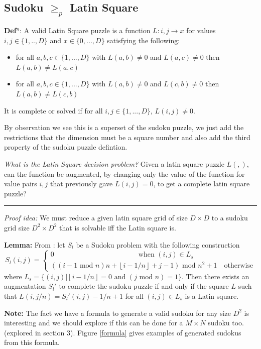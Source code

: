 \documentclass[a4paper,11pt]{report}
\newcounter{row}
\begin{document}
\subsection{Sudoku $\geq_p$ Latin Square}

\textbf{Def$^n$}: A valid Latin Square puzzle is a function $L:i,j \rightarrow x$ for values $i,j \in \{1,..,D\} $ and $x \in
\{0,...,D\}$ satisfying the following:
\begin{itemize}
\item{for all $a,b,c \in \{1,...,D\}$ with $L(a,b) \neq 0 $ and $L(a,c) \neq 0$ then $L(a,b) \neq L(a,c)$}
\item{for all $a,b,c \in \{1,...,D\}$ with $L(a,b) \neq 0 $ and $L(c,b) \neq 0$ then $L(a,b) \neq L(c,b)$}
\end{itemize}
It is complete or solved if for all $i,j \in \{1,...,D\}$, $L(i,j) \neq 0$.

By observation we see this is a superset of the sudoku puzzle, we just add the restrictions that the dimension must be a square number and also add the third property of the sudoku puzzle defintion.

\textit{What is the Latin Square decision problem?} Given a latin square puzzle $L(,)$, can the function be augmented, by changing only the value of the function for value pairs $i,j$ that previously gave $L(i,j) =0$, to get a complete latin square puzzle?

\noindent\rule{4cm}{0.4pt}

\textit{Proof idea:} We must reduce a given latin square grid of size $D \times D$ to a sudoku grid size $D^2 \times D^2$ that is solvable iff the Latin square is.

\textbf{Lemma:} From \cite{sls}: let $S_l$ be a Sudoku problem with the following construction 
\begin{equation}
	S_l(i,j) =\begin{cases}
0 \qquad\qquad\qquad\qquad\qquad\qquad\text{when } (i,j) \in L_s \\ 
((i-1 \text{ mod } n)n + \left\lfloor{i-1/n}\right\rfloor+j-1)\text{ mod } n^2 +1 \quad\text{otherwise}
\end{cases}
\end{equation}
where $L_s=\{(i,j)| \left\lfloor{i-1/n}\right\rfloor=0 \text{ and }(j \text{ mod }n)=1\}$. Then there exists an augmentation $S_l'$ to complete the sudoku puzzle if and only if the square $L$ such that $L(i,j/n)=S_l'(i,j)-1/n+1$ for all $(i,j) \in L_s$ is a Latin square.

\textbf{Note:} The fact we have a formula to generate a valid sudoku for any size $D^2$ is interesting and we should explore if this can be done for a $M\times N$ sudoku too. (explored in section 3). Figure \ref{formula} gives examples of generated sudokus from this formula.
\end{document}

